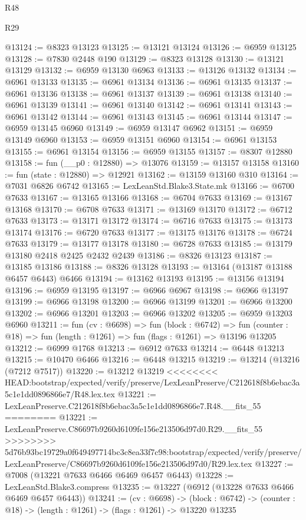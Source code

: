 \begin{lexlean}{R48}
\begin{lexlean}{R29}
\begin{coremodule}
{{{{{{{{{{{{{{{{{{{{{{{{{{{{{{{{{{{{{{{{{{{{{{{{{{{{{{{{{{{{{{{{{{{{{{{{{{{{{{{{{{{{{{{{{{{{{{{{{{{{{{{{{{{{{{{{{{{{{{{{{{{{{{{{{{{{{{{{{{{{{{{{{{{{{{{{{{{{{{{{{{{{{{{{{{{{{{{{{{{{{{{{{{{{{{{{{{{{{{{{{{{{{{{{{{{{{{{{{{@13124 := @8323 @13123
@13125 := @13121 @13124
@13126 := @6959 @13125
@13128 := @7830 @2448 @190
@13129 := @8323 @13128
@13130 := @13121 @13129
@13132 := @6959 @13130 @6963
@13133 := @13126 @13132
@13134 := @6961 @13133
@13135 := @6961 @13134
@13136 := @6961 @13135
@13137 := @6961 @13136
@13138 := @6961 @13137
@13139 := @6961 @13138
@13140 := @6961 @13139
@13141 := @6961 @13140
@13142 := @6961 @13141
@13143 := @6961 @13142
@13144 := @6961 @13143
@13145 := @6961 @13144
@13147 := @6959 @13145 @6960
@13149 := @6959 @13147 @6962
@13151 := @6959 @13149 @6960
@13153 := @6959 @13151 @6960
@13154 := @6961 @13153
@13155 := @6961 @13154
@13156 := @6959 @13155
@13157 := @8307 @12880
@13158 := fun (__p0 : @12880) => @13076
@13159 := @13157 @13158
@13160 := fun (state : @12880) => @12921
@13162 := @13159 @13160 @310
@13164 := @7031 @6826 @6742
@13165 := LexLeanStd.Blake3.State.mk
@13166 := @6700 @7633
@13167 := @13165 @13166
@13168 := @6704 @7633
@13169 := @13167 @13168
@13170 := @6708 @7633
@13171 := @13169 @13170
@13172 := @6712 @7633
@13173 := @13171 @13172
@13174 := @6716 @7633
@13175 := @13173 @13174
@13176 := @6720 @7633
@13177 := @13175 @13176
@13178 := @6724 @7633
@13179 := @13177 @13178
@13180 := @6728 @7633
@13185 := @13179 @13180 @2418 @2425 @2432 @2439
@13186 := @8326 @13123
@13187 := @13185 @13186
@13188 := @8326 @13128
@13193 := @13164 (@13187 @13188 @6457 @6443) @6466
@13194 := @13162 @13193
@13195 := @13156 @13194
@13196 := @6959 @13195
@13197 := @6966 @6967
@13198 := @6966 @13197
@13199 := @6966 @13198
@13200 := @6966 @13199
@13201 := @6966 @13200
@13202 := @6966 @13201
@13203 := @6966 @13202
@13205 := @6959 @13203 @6960
@13211 := fun (cv : @6698) =>
  fun (block : @6742) =>
  fun (counter : @18) => fun (length : @1261) => fun (flags : @1261) => @13196 @13205
@13212 := @6999 @1768
@13213 := @6912 @7633
@13214 := @6448 @13213
@13215 := @10470 @6466
@13216 := @6448 @13215
@13219 := @13214 (@13216 (@7212 @7517))
@13220 := @13212 @13219
<<<<<<<< HEAD:bootstrap/expected/verify/preserve/LexLeanPreserve/C212618f8b6ebac3a5c1e1dd0896866e7/R48.lex.tex
@13221 := LexLeanPreserve.C212618f8b6ebac3a5c1e1dd0896866e7.R48.__fits_55
========
@13221 := LexLeanPreserve.C86697b9260d6109fe156e213506d97d0.R29.__fits_55
>>>>>>>> 5d76b93bc19729a0f649497714bc3c8ea33f7c98:bootstrap/expected/verify/preserve/LexLeanPreserve/C86697b9260d6109fe156e213506d97d0/R29.lex.tex
@13227 := @7008 (@13221 @7633 @6466 @6469 @6457 @6443)
@13228 := LexLeanStd.Blake3.compress
@13235 := @13227 (@6912 (@13228 @7633 @6466 @6469 @6457 @6443))
@13241 := (cv : @6698) ->
  (block : @6742) -> (counter : @18) -> (length : @1261) -> (flags : @1261) -> @13220 @13235
}}}}}}}}}}}}}}}}}}}}}}}}}}}}}}}}}}}}}}}}}}}}}}}}}}}}}}}}}}}}}}}}}}}}}}}}}}}}}}}}}}}}}}}}}}}}}}}}}}}}}}}}}}}}}}}}}}}}}}}}}}}}}}}}}}}}}}}}}}}}}}}}}}}}}}}}}}}}}}}}}}}}}}}}}}}}}}}}}}}}}}}}}}}}}}}}}}}}}}}}}}}}}}}}}}}}}}}}}}
\end{coremodule}
\end{lexlean}
\end{lexlean}
